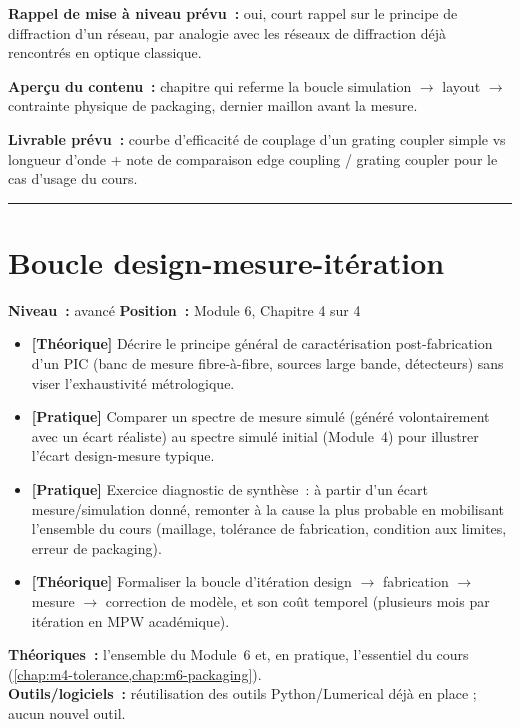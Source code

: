 \noindent\textbf{Rappel de mise à niveau prévu~:} oui, court rappel sur le principe de diffraction d'un réseau, par analogie avec les réseaux de diffraction déjà rencontrés en optique classique.

\noindent\textbf{Aperçu du contenu~:} chapitre qui referme la boucle simulation $\to$ layout $\to$ contrainte physique de packaging, dernier maillon avant la mesure.

\noindent\textbf{Livrable prévu~:} courbe d'efficacité de couplage d'un grating coupler simple vs longueur d'onde + note de comparaison edge coupling / grating coupler pour le cas d'usage du cours.

\bigskip\hrule\bigskip

\chapter{Boucle design-mesure-itération}
\label{chap:m6-boucle}

\noindent\textbf{Niveau~:} avancé \hfill \textbf{Position~:} Module 6, Chapitre 4 sur 4

\begin{objectifs}
\begin{itemize}[leftmargin=1.4em]
  \item \textbf{[Théorique]} Décrire le principe général de caractérisation post-fabrication d'un PIC (banc de mesure fibre-à-fibre, sources large bande, détecteurs) sans viser l'exhaustivité métrologique.
  \item \textbf{[Pratique]} Comparer un spectre de mesure simulé (généré volontairement avec un écart réaliste) au spectre simulé initial (Module~4) pour illustrer l'écart design-mesure typique.
  \item \textbf{[Pratique]} Exercice diagnostic de synthèse~: à partir d'un écart mesure/simulation donné, remonter à la cause la plus probable en mobilisant l'ensemble du cours (maillage, tolérance de fabrication, condition aux limites, erreur de packaging).
  \item \textbf{[Théorique]} Formaliser la boucle d'itération design $\to$ fabrication $\to$ mesure $\to$ correction de modèle, et son coût temporel (plusieurs mois par itération en MPW académique).
\end{itemize}
\end{objectifs}

\begin{prerequis}
\textbf{Théoriques~:} l'ensemble du Module~6 et, en pratique, l'essentiel du cours (\cref{chap:m4-tolerance,chap:m6-packaging}).\\
\textbf{Outils/logiciels~:} réutilisation des outils Python/Lumerical déjà en place ; aucun nouvel outil.
\end{prerequis}

